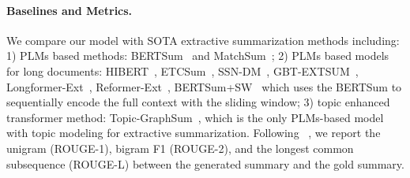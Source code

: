 \documentclass[11pt]{article}
\begin{document}
\paragraph{Baselines and Metrics.}
We compare our model with SOTA extractive summarization methods including: 
1) PLMs based methods: BERTSum~\cite{liu2019text} and MatchSum~\cite{zhong2020extractive}; 2) PLMs based models for long documents:  HIBERT~\cite{zhang2019hibert}, ETCSum~\cite{narayan2020stepwise}, SSN-DM~\cite{cui2021sliding}, GBT-EXTSUM~\cite{grail2021globalizing}, Longformer-Ext~\cite{beltagy2020longformer},
Reformer-Ext~\cite{kitaev2019reformer},
BERTSum+SW~\cite{liu2019text} which uses the BERTSum to sequentially encode the full context with the sliding window; 
3) topic enhanced transformer method: Topic-GraphSum~\cite{cui2021topic}, which is the only PLMs-based model with topic modeling for extractive summarization. 
Following ~\cite{liu2019text}, 
we report the unigram (ROUGE-1), bigram F1 (ROUGE-2), and the longest common subsequence (ROUGE-L) between the generated summary and the gold summary.
\end{document}

